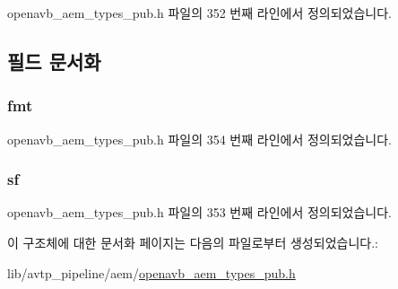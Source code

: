 openavb\+\_\+aem\+\_\+types\+\_\+pub.\+h 파일의 352 번째 라인에서 정의되었습니다.



\subsection{필드 문서화}
\subsubsection[{\texorpdfstring{fmt}{fmt}}]{ fmt}\hypertarget{structopenavb__aem__stream__format__iec__61883__t_ab88030d1822b822615cede2168f1c31e}{}\label{structopenavb__aem__stream__format__iec__61883__t_ab88030d1822b822615cede2168f1c31e}


openavb\+\_\+aem\+\_\+types\+\_\+pub.\+h 파일의 354 번째 라인에서 정의되었습니다.

\subsubsection[{\texorpdfstring{sf}{sf}}]{ sf}\hypertarget{structopenavb__aem__stream__format__iec__61883__t_a153db177c2b7653917dff143e5f755e1}{}\label{structopenavb__aem__stream__format__iec__61883__t_a153db177c2b7653917dff143e5f755e1}


openavb\+\_\+aem\+\_\+types\+\_\+pub.\+h 파일의 353 번째 라인에서 정의되었습니다.



이 구조체에 대한 문서화 페이지는 다음의 파일로부터 생성되었습니다.\+:\begin{DoxyCompactItemize}
\item 
lib/avtp\+\_\+pipeline/aem/\hyperlink{openavb__aem__types__pub_8h}{openavb\+\_\+aem\+\_\+types\+\_\+pub.\+h}\end{DoxyCompactItemize}
